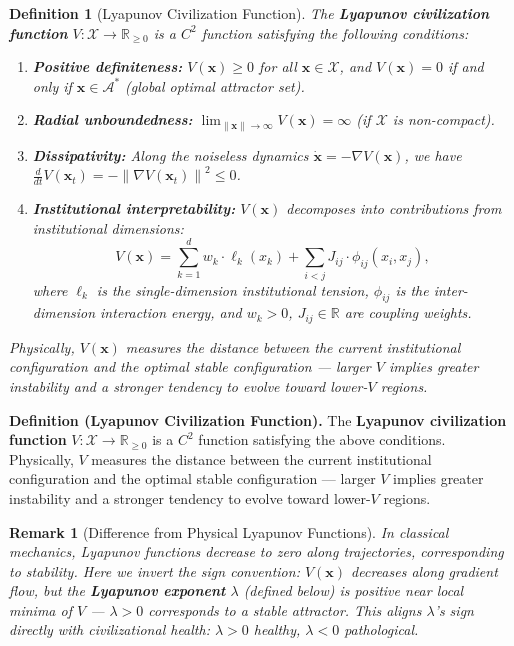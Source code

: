 \documentclass[12pt,a4paper]{article}
\newtheorem{definition}[theorem]{Definition}
\newtheorem{remark}[theorem]{Remark}
\theoremstyle{definition}
\newcommand{\R}{\mathbb{R}}
\newcommand{\norm}[1]{\left\|#1\right\|}
\newcommand{\calA}{\mathcal{A}}
\newcommand{\calX}{\mathcal{X}}
\newcommand{\lb}{\lambda}
\newcommand{\Lyap}{V}
\newcommand{\grad}{\nabla}
\newcommand{\ddt}{\frac{d}{dt}}
\begin{document}
\begin{definition}[Lyapunov Civilization Function]
\label{def:lyap}
The \textbf{Lyapunov civilization function} $\Lyap: \calX \to \R_{\geq 0}$ is a $C^2$ function satisfying the following conditions:
\begin{enumerate}[label=(\roman*), leftmargin=*]
    \item \textbf{Positive definiteness:} $\Lyap(\mathbf{x}) \geq 0$ for all $\mathbf{x} \in \calX$, and $\Lyap(\mathbf{x}) = 0$ if and only if $\mathbf{x} \in \calA^*$ (global optimal attractor set).
    \item \textbf{Radial unboundedness:} $\lim_{\norm{\mathbf{x}} \to \infty} \Lyap(\mathbf{x}) = \infty$ (if $\calX$ is non-compact).
    \item \textbf{Dissipativity:} Along the noiseless dynamics $\dot{\mathbf{x}} = -\grad \Lyap(\mathbf{x})$, we have $\ddt \Lyap(\mathbf{x}_t) = -\norm{\grad \Lyap(\mathbf{x}_t)}^2 \leq 0$.
    \item \textbf{Institutional interpretability:} $\Lyap(\mathbf{x})$ decomposes into contributions from institutional dimensions:
    \begin{equation}\label{eq:lyap_decomp}
        \Lyap(\mathbf{x}) = \sum_{k=1}^{d} w_k \cdot \ell_k(x_k) + \sum_{i<j} J_{ij} \cdot \phi_{ij}(x_i, x_j),
    \end{equation}
    where $\ell_k$ is the single-dimension institutional tension, $\phi_{ij}$ is the inter-dimension interaction energy, and $w_k > 0$, $J_{ij} \in \R$ are coupling weights.
\end{enumerate}
Physically, $\Lyap(\mathbf{x})$ measures the distance between the current institutional configuration and the optimal stable configuration --- larger $\Lyap$ implies greater instability and a stronger tendency to evolve toward lower-$\Lyap$ regions.
\end{definition}

\noindent
\textbf{Definition (Lyapunov Civilization Function).}
The \textbf{Lyapunov civilization function} $\Lyap: \calX \to \R_{\geq 0}$ is a $C^2$ function satisfying the above conditions. Physically, $\Lyap$ measures the distance between the current institutional configuration and the optimal stable configuration --- larger $\Lyap$ implies greater instability and a stronger tendency to evolve toward lower-$\Lyap$ regions.

\begin{remark}[Difference from Physical Lyapunov Functions]
In classical mechanics, Lyapunov functions decrease to zero along trajectories, corresponding to stability. Here we invert the sign convention: $\Lyap(\mathbf{x})$ decreases along gradient flow, but the \textbf{Lyapunov exponent} $\lb$ (defined below) is positive near local minima of $\Lyap$ --- $\lb>0$ corresponds to a stable attractor. This aligns $\lb$'s sign directly with civilizational health: $\lb>0$ healthy, $\lb<0$ pathological.
\end{remark}
\end{document}

